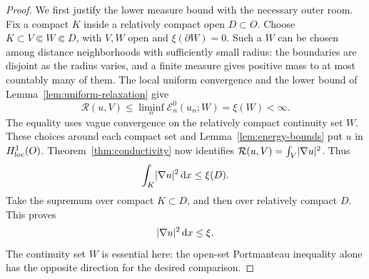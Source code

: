 \begin{proof}
We first justify the lower measure bound with the necessary outer room.
Fix a compact \(K\) inside a relatively compact open \(D\subset O\).
Choose \(K\subset V\Subset W\Subset D\), with \(V,W\) open and
\(\xi(\partial W)=0\).  Such a \(W\) can be chosen among distance
neighborhoods with sufficiently small radius: the boundaries are disjoint
as the radius varies, and a finite measure gives positive mass to at most
countably many of them.  The local uniform convergence and the lower
bound of Lemma~\ref{lem:uniform-relaxation} give
\[
 \mathcal R(u,V)
 \le\liminf_n\mathcal E_n^0(u_n;W)=\xi(W)<\infty.
\]
The equality uses vague convergence on the relatively compact continuity
set \(W\).  These choices around each compact set and
Lemma~\ref{lem:energy-bounds} put \(u\) in \(H^1_{\rm loc}(O)\).
Theorem~\ref{thm:conductivity} now identifies
\(\mathcal R(u,V)=\int_V\lvert \nabla u\rvert^2\).  Thus
\[
 \int_K\lvert \nabla u\rvert^2\,\mathrm d x\le\xi(D).
\]
Take the supremum over compact \(K\subset D\), and then over relatively
compact \(D\).  This proves
\begin{equation}\label{eq:energy-defect-lower}
                        \lvert \nabla u\rvert^2\,\mathrm d x\le\xi.
\end{equation}
The continuity set \(W\) is essential here: the open-set Portmanteau
inequality alone has the opposite direction for the desired comparison.


\end{proof}
